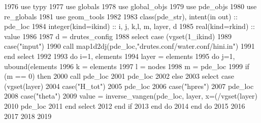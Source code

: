 \begin{DoxyCode}
1976         \textcolor{keywordtype}{use }typy
1977         \textcolor{keywordtype}{use }globals
1978         \textcolor{keywordtype}{use }global_objs
1979         \textcolor{keywordtype}{use }pde_objs
1980         \textcolor{keywordtype}{use }re_globals
1981         \textcolor{keywordtype}{use }geom_tools
1982         
1983         \textcolor{keywordtype}{class}(pde_str), \textcolor{keywordtype}{intent(in out)} :: pde\_loc
1984         \textcolor{keywordtype}{integer(kind=ikind)} :: i, j, k,l, m, layer, d
1985         \textcolor{keywordtype}{real(kind=rkind)} :: value
1986         
1987         d = drutes_config%
1988         \textcolor{keywordflow}{select case} (vgset(1\_ikind)%
1989           \textcolor{keywordflow}{case}(\textcolor{stringliteral}{"input"})
1990             \textcolor{keyword}{call }map1d2dj(pde\_loc,\textcolor{stringliteral}{"drutes.conf/water.conf/hini.in"})
1991 \textcolor{keywordflow}{        end select}
1992         
1993         \textcolor{keywordflow}{do} i=1, elements%
1994           layer = elements%
1995           \textcolor{keywordflow}{do} j=1, ubound(elements%
1996             k = elements%
1997             l = nodes%
1998             m = pde\_loc%
1999             \textcolor{keywordflow}{if} (m == 0) \textcolor{keywordflow}{then}
2000               \textcolor{keyword}{call }pde\_loc%
2001               pde\_loc%
2002             \textcolor{keywordflow}{else}
2003               \textcolor{keywordflow}{select case} (vgset(layer)%
2004                 \textcolor{keywordflow}{case}(\textcolor{stringliteral}{"H\_tot"})
2005                   pde\_loc%
2006                 \textcolor{keywordflow}{case}(\textcolor{stringliteral}{"hpres"})
2007                   pde\_loc%
2008                 \textcolor{keywordflow}{case}(\textcolor{stringliteral}{"theta"})
2009                   \textcolor{keywordtype}{value} = inverse_vangen(pde\_loc, layer, x=(/vgset(layer)%
2010                   pde\_loc%
2011 \textcolor{keywordflow}{              end select}
2012 \textcolor{keywordflow}{            end if}
2013 \textcolor{keywordflow}{          end do}   
2014 \textcolor{keywordflow}{        end do}
2015         
2016         
2017 
2018 
2019 
\end{DoxyCode}


